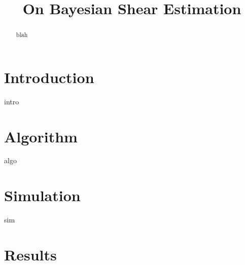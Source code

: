\documentclass[12pt,preprint]{aastex}
\begin{document}
\title{On Bayesian Shear Estimation}



\begin{abstract}

blah

\end{abstract}

\section{Introduction} \label{sec:intro}

intro

\section{Algorithm} \label{sec:algo}

algo

\section{Simulation} \label{sec:sim}

sim

\section{Results} \label{sec:results}
\end{document}
